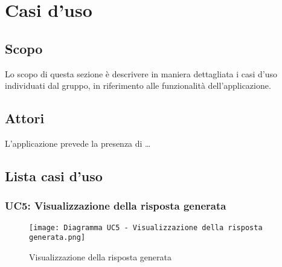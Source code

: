 
\section{Casi d'uso}
\label{sec:casi_uso}

\subsection{Scopo}

Lo scopo di questa sezione è descrivere in maniera dettagliata i casi d’uso individuati dal
gruppo, in riferimento alle funzionalità dell’applicazione.


\subsection{Attori}

L’applicazione prevede la presenza di \dots


\subsection{Lista casi d'uso}



\hypertarget{UC5}{}
\subsubsection{UC5: Visualizzazione della risposta generata}

\begin{figure}[h]
    \centering
    \texttt{[image: Diagramma UC5 - Visualizzazione della risposta generata.png]}
    \caption{Visualizzazione della risposta generata}
\end{figure}


